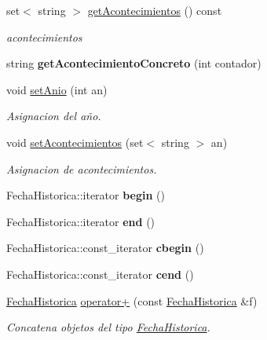 \begin{DoxyCompactItemize}
set$<$ string $>$ \hyperlink{classFechaHistorica_a152137649f0de25a3b8381b471092392}{get\+Acontecimientos} () const
\begin{DoxyCompactList}\small\item\em acontecimientos \end{DoxyCompactList}\item 
\mbox{\label{classFechaHistorica_a06768b8365452b90d4968c4871e09907}} 
string {\bfseries get\+Acontecimiento\+Concreto} (int contador)
\item 
void \hyperlink{classFechaHistorica_a55f87cfab32b184a9935df7184fa5ca5}{set\+Anio} (int an)
\begin{DoxyCompactList}\small\item\em Asignacion del año. \end{DoxyCompactList}\item 
void \hyperlink{classFechaHistorica_aaef162c4e917b3de4f0fb0fdf948c69b}{set\+Acontecimientos} (set$<$ string $>$ an)
\begin{DoxyCompactList}\small\item\em Asignacion de acontecimientos. \end{DoxyCompactList}\item 
\mbox{\label{classFechaHistorica_ae2909c4949ba29bef587ebe7287f6942}} 
Fecha\+Historica\+::iterator {\bfseries begin} ()
\item 
\mbox{\label{classFechaHistorica_a1611c600bf9ac153fbd0a75884f5dd67}} 
Fecha\+Historica\+::iterator {\bfseries end} ()
\item 
\mbox{\label{classFechaHistorica_a3f9d2dda53b41eaf9954a7c2a2e294dc}} 
Fecha\+Historica\+::const\+\_\+iterator {\bfseries cbegin} ()
\item 
\mbox{\label{classFechaHistorica_aab76098fde2707a29eef8518cfa27c41}} 
Fecha\+Historica\+::const\+\_\+iterator {\bfseries cend} ()
\item 
\hyperlink{classFechaHistorica}{Fecha\+Historica} \hyperlink{classFechaHistorica_ab347a73527ad931f66fc1bb14dcf0de3}{operator+} (const \hyperlink{classFechaHistorica}{Fecha\+Historica} \&f)
\begin{DoxyCompactList}\small\item\em Concatena objetos del tipo \hyperlink{classFechaHistorica}{Fecha\+Historica}. \end{DoxyCompactList}\item 

\end{DoxyCompactItemize}
